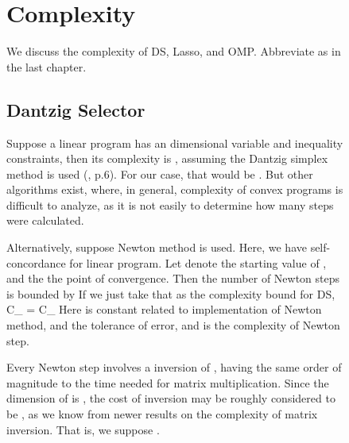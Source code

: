 \begin {figure} [H]
\section {Complexity}

We discuss the complexity of DS, Lasso, and OMP.
Abbreviate  as in the last chapter.

\subsection {Dantzig Selector}

Suppose a linear program has an  dimensional variable and  inequality constraints, then its complexity is , assuming the Dantzig simplex method is used (\cite {BoV04}, p.6).
For our case, that would be .
But other algorithms exist, where, in general, complexity of convex programs is difficult to analyze, as it is not easily to determine how many steps were calculated.

Alternatively, suppose Newton method is used.
Here, we have self-concordance for linear program.
Let  denote the starting value of , and  the the point of convergence.
Then the number of Newton steps is bounded \cite {BoV04} by
%
%
If we just take that as the complexity bound for DS,
%
 {
C_{}
=  C_{}
}
%
Here  is constant related to implementation of Newton method, and \m {\e} the tolerance of error, and  is the complexity of Newton step.

Every Newton step involves a inversion of , having the same order of magnitude to the time needed for matrix multiplication.
Since the dimension of  is , the cost of inversion may be roughly considered to be , as we know from newer results on the complexity of matrix inversion.
That is, we suppose .


\end{figure}
